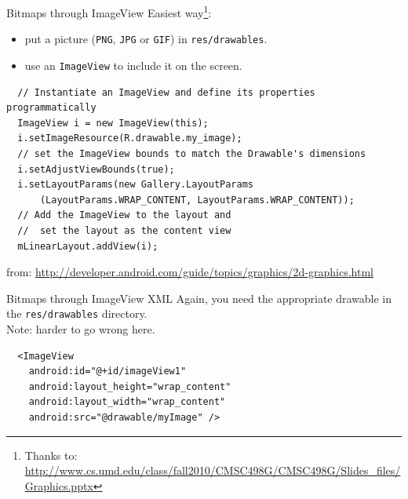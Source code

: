 \documentclass[aspectratio=169]{beamer}
\begin{document}
\begin{frame}[fragile]{Bitmaps through ImageView}
Easiest way\footnote{\tiny Thanks to: \url{http://www.cs.umd.edu/class/fall2010/CMSC498G/CMSC498G/Slides_files/Graphics.pptx}}:  
\begin{itemize}
\item put a picture ({\tt PNG}, {\tt JPG} or {\tt GIF}) in {\tt res/drawables}.
\item use an {\tt ImageView} to include it on the screen.
\end{itemize}
{\scriptsize
\begin{verbatim}
  // Instantiate an ImageView and define its properties programmatically
  ImageView i = new ImageView(this);
  i.setImageResource(R.drawable.my_image);
  // set the ImageView bounds to match the Drawable's dimensions
  i.setAdjustViewBounds(true);
  i.setLayoutParams(new Gallery.LayoutParams
      (LayoutParams.WRAP_CONTENT, LayoutParams.WRAP_CONTENT));
  // Add the ImageView to the layout and 
  //  set the layout as the content view
  mLinearLayout.addView(i);
\end{verbatim}
}
\vspace{-0.5em}
\tiny from: \url{http://developer.android.com/guide/topics/graphics/2d-graphics.html}
\vspace{1em}
\end{frame}



\begin{frame}[fragile]{Bitmaps through ImageView XML}
Again, you need the appropriate drawable in the {\tt res/drawables} directory.\\[1em]
Note: harder to go wrong here.

\begin{verbatim}
  <ImageView
    android:id="@+id/imageView1"
    android:layout_height="wrap_content"
    android:layout_width="wrap_content"
    android:src="@drawable/myImage" />
\end{verbatim}
\end{frame}
\end{document}

